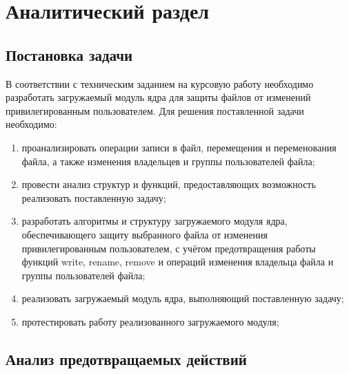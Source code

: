 \section{\large Аналитический раздел}


\subsection{Постановка задачи}

В соответствии с техническим заданием на курсовую работу необходимо разработать загружаемый модуль ядра для защиты файлов от изменений привилегированным пользователем.
Для решения поставленной задачи необходимо:
\begin{enumerate}[label=\arabic*)]
	\item проанализировать операции записи в файл, перемещения и переменования файла, а также изменения владельцев и группы пользователей файла;
	\item провести анализ структур и функций, предоставляющих возможность реализовать поставленную задачу;
	\item разработать алгоритмы и структуру загружаемого модуля ядра, обеспечивающего защиту выбранного файла от  изменения привилегированным пользователем, с учётом предотвращения работы функций write, rename, remove и операций изменения владельца файла и группы пользователей файла;
	\item реализовать загружаемый модуль ядра, выполняющий поставленную задачу;
	\item протестировать работу реализованного загружаемого модуля;
\end{enumerate}


%

\subsection{Анализ предотвращаемых действий}

